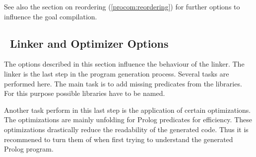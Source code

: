 See also the section on reordering (\ref{procom:reordering}) for further
options to influence the goal compilation.



\subsection{\ProCom\ Linker and Optimizer Options}

The options described in this section influence the behaviour of the linker.
The linker is the last step in the program generation process. Several tasks
are performed here. The main task is to add missing predicates from the
libraries. For this purpose possible libraries have to be named.

Another task perform in this last step is the application of certain
optimizations. The optimizations are mainly unfolding for Prolog predicates
for efficiency. These optimizations drastically reduce the readability of the
generated code. Thus it is recommened to turn them of when first trying to
understand the generated Prolog program.

